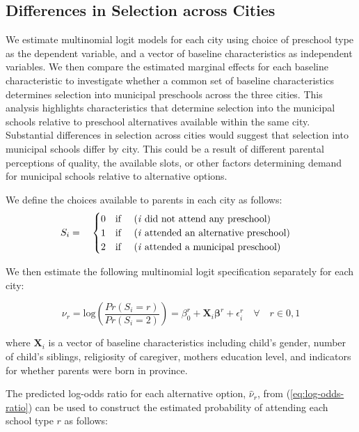 

\subsection{Differences in Selection across Cities}
We estimate multinomial logit models for each city using choice of preschool type as the dependent variable, and a vector of baseline characteristics as independent variables. We then compare the estimated marginal effects for each baseline characteristic to investigate whether a common set of baseline characteristics determines selection into municipal preschools across the three cities. This analysis highlights characteristics that determine selection into the municipal schools relative to preschool alternatives available within the same city. Substantial differences in selection across cities would suggest that selection into municipal schools differ by city. This could be a result of different parental perceptions of quality, the available slots, or other factors determining demand for municipal schools relative to alternative options.

We define the choices available to parents in each city as follows:
\begin{equation}
S_i = \quad
\begin{cases}
0 \quad \text{if \quad (\textit{i} did not attend any preschool)} \\
1 \quad  \text{if \quad (\textit{i} attended an alternative preschool)} \\
2 \quad \text{if \quad (\textit{i} attended a municipal preschool)}  \\
\end{cases}
\end{equation}

\noindent We then estimate the following multinomial logit specification separately for each city:

\begin{equation} \label{eq:log-odds-ratio}
\nu_r = \text{log} \left(\frac{Pr(S_i=r)}{Pr(S_i=2)}\right) = \beta_0^r +  \bm{X}_i\bm{\beta}^r + \epsilon_i^r \quad \forall \quad r \in 0,1
\end{equation}

\noindent where $\bm{X}_i$ is a vector of baseline characteristics including child's gender, number of child's siblings, religiosity of caregiver, mothers education level, and indicators for whether parents were born in province.

The predicted log-odds ratio for each alternative option, $\hat{\nu}_r$, from (\ref{eq:log-odds-ratio}) can be used to construct the estimated probability of attending each school type $r$ as follows:

